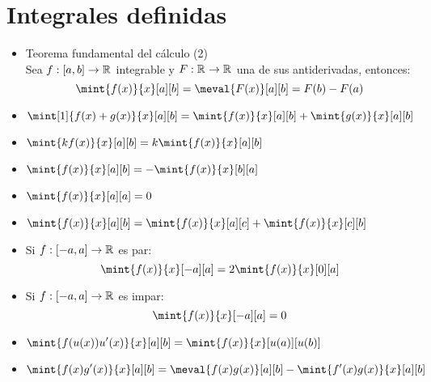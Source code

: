 \section{Integrales definidas}
\begin{itemize}
	\item Teorema fundamental del cálculo (2)\\
	Sea $f:\left[ a, b \right]\to\mathbb{R}^{}$ integrable y $F:\mathbb{R}^{}\to\mathbb{R}^{}$ una de sus antiderivadas, entonces:
	\[ \mint{f(x)}{x}[a][b] =\meval{F(x)}[a][b] = F(b) - F(a) \]
	\item $\ds\mint[1]{f(x) + g(x)}{x}[a][b] =\mint{f(x)}{x}[a][b] + \mint{g(x)}{x}[a][b]$
	\item $\ds\mint{kf(x)}{x}[a][b] =k\mint{f(x)}{x}[a][b]$
	\item $\ds\mint{f(x)}{x}[a][b] = -\mint{f(x)}{x}[b][a]$
	\item $\ds\mint{f(x)}{x}[a][a] = 0$
	\item $\ds\mint{f(x)}{x}[a][b] =\mint{f(x)}{x}[a][c] +\mint{f(x)}{x}[c][b]$
	\item Si $f:\left[ -a, a \right]\to\mathbb{R}^{}$ es par: 
	\[ \ds\mint{f(x)}{x}[-a][a] =2\mint{f(x)}{x}[0][a] \]
	\item Si $f:\left[ -a, a \right]\to\mathbb{R}^{}$ es impar: 
	\[ \ds\mint{f(x)}{x}[-a][a] = 0 \]
	\item $\ds\mint{f(u(x))u'(x)}{x}[a][b] =\mint{f(x)}{x}[u(a)][u(b)]$
	\item $\ds\mint{f(x)g'(x)}{x}[a][b] =\meval{f(x)g(x)}[a][b] -\mint{f'(x)g(x)}{x}[a][b]$
\end{itemize}